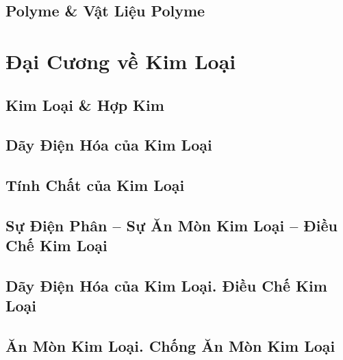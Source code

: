 \documentclass{article}
\numberwithin{equation}{section}
\begin{document}

\subsection{Polyme \& Vật Liệu Polyme}


\section{Đại Cương về Kim Loại}

\subsection{Kim Loại \& Hợp Kim}


\subsection{Dãy Điện Hóa của Kim Loại}


\subsection{Tính Chất của Kim Loại}


\subsection{Sự Điện Phân -- Sự Ăn Mòn Kim Loại -- Điều Chế Kim Loại}


\subsection{Dãy Điện Hóa của Kim Loại. Điều Chế Kim Loại}


\subsection{Ăn Mòn Kim Loại. Chống Ăn Mòn Kim Loại}
\end{document}
